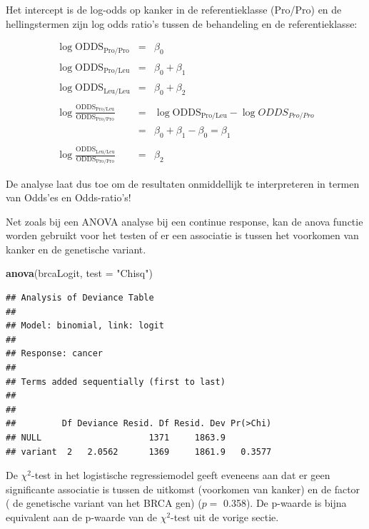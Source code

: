 \documentclass[
  12pt,dutch]{book}
\newenvironment{Shaded}{\begin{snugshade}}{\end{snugshade}}
\newcommand{\AttributeTok}[1]{\textcolor[rgb]{0.13,0.29,0.53}{#1}}
\newcommand{\FunctionTok}[1]{\textcolor[rgb]{0.13,0.29,0.53}{\textbf{#1}}}
\newcommand{\NormalTok}[1]{#1}
\newcommand{\StringTok}[1]{\textcolor[rgb]{0.31,0.60,0.02}{#1}}
\theoremstyle{definition}
\theoremstyle{definition}
\theoremstyle{definition}
\theoremstyle{definition}
\theoremstyle{remark}
\begin{document}
Het intercept is de log-odds op kanker in de referentieklasse (Pro/Pro) en de hellingstermen zijn log odds ratio's tussen de behandeling en de referentieklasse:

\begin{eqnarray*}
\log \text{ODDS}_\text{Pro/Pro}&=&\beta_0\\\\
\log \text{ODDS}_\text{Pro/Leu}&=&\beta_0+\beta_1\\\\
\log \text{ODDS}_\text{Leu/Leu}&=&\beta_0+\beta_2\\\\
\log  \frac{\text{ODDS}_\text{Pro/Leu}}{\text{ODDS}_\text{Pro/Pro}}&=&\log \text{ODDS}_\text{Pro/Leu}-\log ODDS_{Pro/Pro}\\
&=&\beta_0+\beta_1-\beta_0=\beta_1\\\\
\log  \frac{\text{ODDS}_\text{Leu/Leu}}{\text{ODDS}_\text{Pro/Pro}}&=&\beta_2
\end{eqnarray*}

De analyse laat dus toe om de resultaten onmiddellijk te interpreteren in termen van Odds'es en Odds-ratio's!

Net zoals bij een ANOVA analyse bij een continue response, kan de anova functie worden gebruikt voor het testen of er een associatie is tussen het voorkomen van kanker en de genetische variant.

\begin{Shaded}
\begin{Highlighting}[]
\FunctionTok{anova}\NormalTok{(brcaLogit, }\AttributeTok{test =} \StringTok{"Chisq"}\NormalTok{)}
\end{Highlighting}
\end{Shaded}

\begin{verbatim}
## Analysis of Deviance Table
## 
## Model: binomial, link: logit
## 
## Response: cancer
## 
## Terms added sequentially (first to last)
## 
## 
##         Df Deviance Resid. Df Resid. Dev Pr(>Chi)
## NULL                     1371     1863.9         
## variant  2   2.0562      1369     1861.9   0.3577
\end{verbatim}

De \(\chi^2\)-test in het logistische regressiemodel geeft eveneens aan dat er geen significante associatie is tussen de uitkomst (voorkomen van kanker) en de factor ( de genetische variant van het BRCA gen) (\(p=\) 0.358).
De p-waarde is bijna equivalent aan de p-waarde van de \(\chi^2\)-test uit de vorige sectie.
\end{document}
